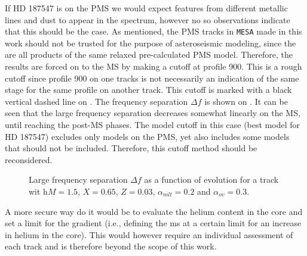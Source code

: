 If HD 187547 is on the PMS we would expect features from different metallic lines and dust to appear in the spectrum, however no so observations indicate that this should be the case. As mentioned, the PMS tracks in \texttt{MESA} made in this work should not be trusted for  the purpose of asteroseismic modeling, since the are all products of the same relaxed pre-calculated PMS model. Therefore, the results are forced on to the MS by making a cutoff at profile 900. This is a rough cutoff since profile 900 on one tracks is not necessarily an indication of the same stage for the same profile on another track. This cutoff is marked with a black vertical dashed line on . The frequency separation $\Delta f$ is shown on . It can be seen that the large frequency separation decreases somewhat linearly on the MS, until reaching the post-MS phases. The model cutoff in this case (best model for HD 187547) excludes only models on the PMS, yet also includes some models that should not be included. Therefore, this cutoff method should be reconsidered. 

\begin{figure}[htbp]
	\centering
	\caption{Large frequency separation $\Delta f$ as a function of evolution for a track wit h$M=1.5$\msun, $X=0.65$, $Z=0.03$, $\alpha_{mlt}=0.2$ and $\alpha_{ov}=0.3$.}
	\label{plotfreqsastime}
\end{figure}

 A more secure way do it would be to evaluate the helium content in the core and set a limit for the gradient (i.e., defining the ms at a certain limit for an increase in helium in the core). This would however require an individual assessment of each track and is therefore beyond the scope of this work. 

